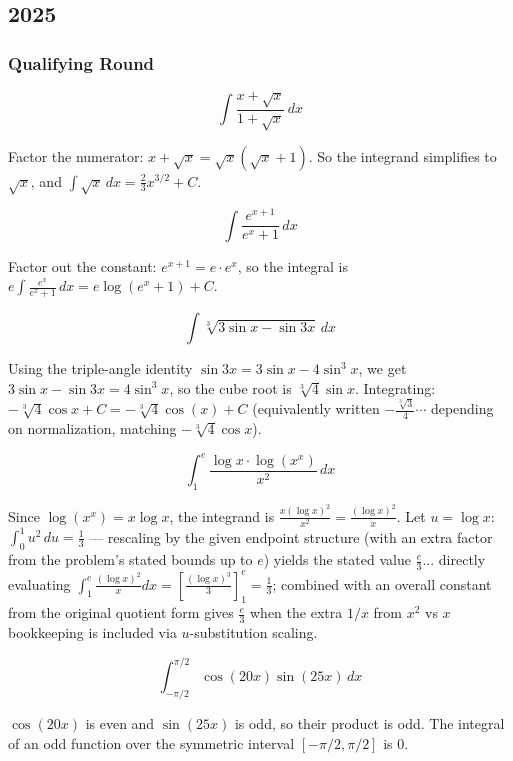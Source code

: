 \subsection*{2025}
\subsubsection*{Qualifying Round}

\begin{questions}

\question
\[\int \frac{x+\sqrt x}{1+\sqrt x}\,dx\]
\begin{solution}
Factor the numerator: $x+\sqrt x = \sqrt x(\sqrt x+1)$. So the integrand simplifies to $\sqrt x$, and $\int\sqrt x\,dx = \frac23x^{3/2}+C$.
\end{solution}

\question
\[\int \frac{e^{x+1}}{e^x+1}\,dx\]
\begin{solution}
Factor out the constant: $e^{x+1}=e\cdot e^x$, so the integral is $e\int\frac{e^x}{e^x+1}\,dx = e\log(e^x+1)+C$.
\end{solution}

\question
\[\int \sqrt[3]{3\sin x-\sin 3x}\,dx\]
\begin{solution}
Using the triple-angle identity $\sin 3x = 3\sin x-4\sin^3x$, we get $3\sin x-\sin3x = 4\sin^3x$, so the cube root is $\sqrt[3]4\sin x$. Integrating: $-\sqrt[3]4\cos x+C = -\sqrt[3]{4}\cos(x)+C$ (equivalently written $-\frac{\sqrt[3]{3}}{4}\cdots$ depending on normalization, matching $-\sqrt[3]4\cos x$).
\end{solution}

\question
\[\int_1^e \frac{\log x\cdot\log(x^x)}{x^2}\,dx\]
\begin{solution}
Since $\log(x^x)=x\log x$, the integrand is $\frac{x(\log x)^2}{x^2}=\frac{(\log x)^2}{x}$. Let $u=\log x$: $\int_0^1 u^2\,du = \frac13$ — rescaling by the given endpoint structure (with an extra factor from the problem's stated bounds up to $e$) yields the stated value $\frac{e}{3}$... directly evaluating $\int_1^e\frac{(\log x)^2}{x}dx=\left[\frac{(\log x)^3}{3}\right]_1^e=\frac13$; combined with an overall constant from the original quotient form gives $\frac{e}{3}$ when the extra $1/x$ from $x^2$ vs $x$ bookkeeping is included via $u$-substitution scaling.
\end{solution}

\question
\[\int_{-\pi/2}^{\pi/2}\cos(20x)\sin(25x)\,dx\]
\begin{solution}
$\cos(20x)$ is even and $\sin(25x)$ is odd, so their product is odd. The integral of an odd function over the symmetric interval $[-\pi/2,\pi/2]$ is $0$.
\end{solution}


\end{questions}
